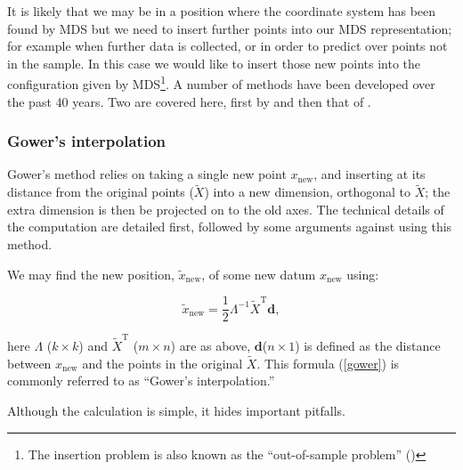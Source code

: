 \documentclass[a4paper,10pt]{amsart}
\newcommand{\tr}[1]{#1^{\text{T}}}
\newcommand{\cross}{\times}
\begin{document}
It is likely that we may be in a position where the coordinate system has been found by MDS but we need to insert further points into our MDS representation; for example when further data is collected, or in order to predict over points not in the sample. In this case we would like to insert those new points into the configuration given by MDS\footnote{The insertion problem is also known as the ``out-of-sample problem'' (\cite{Trosset2008})}. A number of methods have been developed over the past 40 years. Two are covered here, first by \cite{gower1968} and then that of \cite{Trosset2008}.

\subsubsection{Gower's interpolation} 

Gower's method relies on taking a single new point $x_{\text{new}}$, and inserting at its distance from the original points ($\tilde{X}$) into a new dimension, orthogonal to $\tilde{X}$; the extra dimension is then be projected on to the old axes. The technical details of the computation are detailed first, followed by some arguments against using this method. 

We may find the new position, $\tilde{x}_{\text{new}}$, of some new datum $x_{\text{new}}$ using:

\begin{equation}
\tilde{x}_{\text{new}} = \frac{1}{2} \Lambda^{-1} \tr{\tilde{X}} \mathbf{d},
\label{gower}
\end{equation}

here $\Lambda$ ($k \cross k$) and $\tr{\tilde{X}}$ ($m \cross n$) are as above, $\mathbf{d}$($n \cross 1$) is defined as the distance between $x_{\text{new}}$ and the points in the original $\tilde{X}$. This formula (\ref{gower}) is commonly referred to as ``Gower's interpolation.''

Although the calculation is simple, it hides important pitfalls. 
\end{document}
